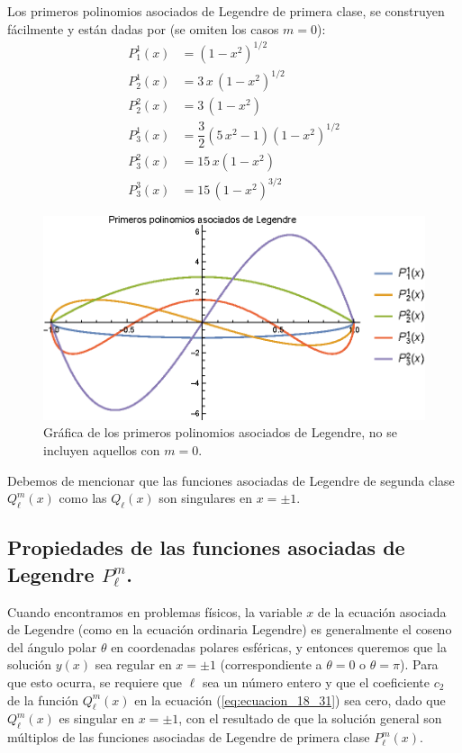 \par
Los primeros polinomios asociados de Legendre de primera clase, se construyen fácilmente y están dadas por (se omiten los casos $m=0$):
\begin{align*}
P_{1}^{1} (x) &= (1 - x^{2})^{1/2} \\[0.5em]
P_{2}^{1} (x) &= 3 \, x \, (1 - x^{2})^{1/2} \\[0.5em]
P_{2}^{2} (x) &= 3 \, (1 - x^{2}) \\[0.5em]
P_{3}^{1} (x) &= \dfrac{3}{2}(5 \, x^{2} - 1)(1 - x^{2})^{1/2} \\[0.5em]
P_{3}^{2} (x) &= 15 \, x (1 - x^{2}) \\[0.5em]
P_{3}^{3} (x) &= 15 \, (1 - x^{2})^{3/2}
\end{align*}
\begin{figure}[H]
    \centering
    \includegraphics[scale=1]{Imagenes/Plot_Asociados_Lagrange.eps}
    \caption{Gráfica de los primeros polinomios asociados de Legendre, no se incluyen aquellos con $m = 0$.}
    \label{fig:figura_asociados_Legedre}
\end{figure}
Debemos de mencionar que las funciones asociadas de Legendre de segunda clase $Q_{\ell}^{m} (x)$ como las $Q_{\ell}(x)$ son singulares en $x = \pm 1$.
\subsection{Propiedades de las funciones asociadas de Legendre $P_{\ell}^{m}$.}
Cuando encontramos en problemas físicos, la variable $x$ de la ecuación asociada de Legendre (como en la ecuación ordinaria Legendre) es generalmente el coseno del ángulo polar $\theta$ en coordenadas polares esféricas, y entonces queremos que la solución $y (x)$ sea regular en $x = \pm 1$ (correspondiente a $\theta = 0$ o $\theta = \pi$). Para que esto ocurra, se requiere que $\ell$ sea un número entero y que el coeficiente $c_{2}$ de la función $Q_{\ell}^{m} (x)$ en la ecuación (\ref{eq:ecuacion_18_31}) sea cero, dado que $Q_{\ell}^{m}(x)$ es singular en $x = \pm 1$, con el resultado de que la solución general son múltiplos de las funciones asociadas de Legendre de primera clase $P_{\ell}^{m}(x)$.
